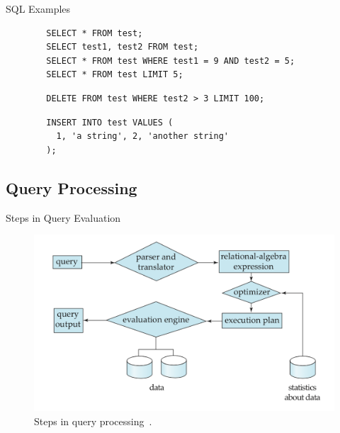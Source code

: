 \documentclass{beamer}
\begin{document}
\begin{frame}[fragile]{SQL Examples}
\begin{example}
    \begin{verbatim}
        SELECT * FROM test;
        SELECT test1, test2 FROM test;
        SELECT * FROM test WHERE test1 = 9 AND test2 = 5;
        SELECT * FROM test LIMIT 5;
    \end{verbatim}
  \end{example} \pause
  \begin{example}
    \begin{verbatim}
        DELETE FROM test WHERE test2 > 3 LIMIT 100;
    \end{verbatim}
  \end{example}  \pause
    \begin{example}
    \begin{verbatim}
        INSERT INTO test VALUES (
          1, 'a string', 2, 'another string'
        );
        \end{verbatim}
  \end{example}
\end{frame}

\subsection{Query Processing}

\begin{frame}{Steps in Query Evaluation}
\begin{figure}
  \includegraphics[width=\linewidth]{QueryProcessing}
  \caption{Steps in query processing~\citep[583]{silberschatz2010database}.}
  
\end{figure}
\end{frame}
\end{document}

